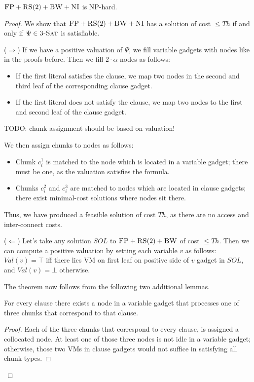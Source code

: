 \documentclass[9pt,twocolumn]{scrartcl}
\newcommand{\clauses}{\alpha}
\newcommand{\achunk}{\ensuremath{c}}
\newcommand{\CC}{\textsc{NI}}
\newcommand{\FP}{\textsc{FP}}
\newcommand{\RS}{\textsc{RS}}
\newcommand{\BW}{\textsc{BW}}
\newcommand{\TSAT}{\textsc{3-Sat}}
\newcommand{\Formula}{\ensuremath{\Psi}}
\newcommand{\Thr}{\ensuremath{Th}}
\newcommand{\Val}{\ensuremath{Val}}
\newcommand{\Sol}{\ensuremath{SOL}}
\begin{document}
\begin{appendix}
\begin{theorem}
$\FP+\RS(2)+\BW+\CC$ is NP-hard.
\end{theorem}
\begin{proof}
We show that $\FP+\RS(2)+\BW+\CC$ has a solution of cost $\leq
  \Thr$ if and only if $\Formula\in \TSAT$ is satisfiable.

($\Rightarrow$) If we have a positive valuation of $\Formula$, we fill variable gadgets with nodes like in
the proofs before. Then we fill $2 \cdot \clauses$ nodes as follows:
\begin{itemize}
\item If the first literal satisfies the clause, we map two nodes in the second and
third leaf of the corresponding clause gadget.
\item If the first literal does not satisfy the clause, we map two nodes to the first
and second leaf of the clause gadget.
\end{itemize}

TODO: chunk assignment should be based on valuation!

We then assign chunks to nodes as follows:
\begin{itemize}
\item Chunk $\achunk_i^1$ is matched to the node which is located in a variable gadget; there
must be one, as the valuation satisfies the formula.
\item Chunks $\achunk_i^2$ and $\achunk_i^3$ are matched to nodes which are
located in clause
gadgets; there exist minimal-cost solutions where nodes sit there.
\end{itemize}

Thus, we have produced a feasible solution of cost $\Thr$, as there are no
access and inter-connect costs.

($\Leftarrow$)
Let's take any solution $\Sol$ to $\FP+\RS(2)+\BW$ of cost $\leq \Thr$.
Then we can compute a positive valuation by setting each variable $v$
as follows:
$\Val(v)= \top$ iff there lies VM on first leaf on positive side of $v$ gadget in $\Sol$,
and $\Val(v)=\bot$ otherwise.


The theorem now follows from the following two additional lemmas.
\begin{lemma}
For every clause there exists a node in a variable gadget that processes one of
  three chunks that correspond to that clause.
\end{lemma}
\begin{proof}
 Each of the three chunks that correspond to every clause,
 is assigned a collocated node.
 At least one of those three nodes is not idle in a variable gadget;
otherwise, those two VMs in clause gadgets would not suffice in
satisfying all chunk types.
\end{proof}


\end{proof}
\end{appendix}
\end{document}
